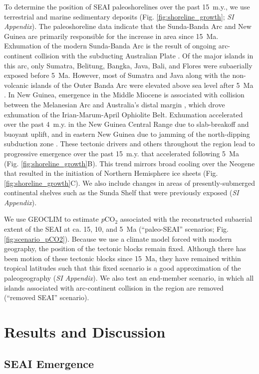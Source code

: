 \documentclass[9pt,twocolumn,twoside,lineno]{pnas-new}
\newcommand{\pCOtwo}{\textit{p}CO$_{2}$\xspace}
\newcommand{\SI}{\textit{SI Appendix}\xspace}
\begin{document}
To determine the position of SEAI paleoshorelines over the past 15~m.y., we use terrestrial and marine sedimentary deposits (Fig. \ref{fig:shoreline_growth}; \SI). The paleoshoreline data indicate that the Sunda-Banda Arc and New Guinea are primarily responsible for the increase in area since 15~Ma. Exhumation of the modern Sunda-Banda Arc is the result of ongoing arc-continent collision with the subducting Australian Plate \cite{Harris2006a}. Of the major islands in this arc, only Sumatra, Belitung, Bangka, Java, Bali, and Flores were subaerially exposed before 5~Ma. However, most of Sumatra and Java along with the non-volcanic islands of the Outer Banda Arc were elevated above sea level after 5~Ma \cite{Hall2013b}. In New Guinea, emergence in the Middle Miocene is associated with collision between the Melanesian Arc and Australia's distal margin \cite{Cloos2005a}, which drove exhumation of the Irian-Marum-April Ophiolite Belt. Exhumation accelerated over the past 4~m.y. in the New Guinea Central Range due to slab-breakoff and buoyant uplift, and in eastern New Guinea due to jamming of the north-dipping subduction zone \cite{Cloos2005a}. These tectonic drivers and others throughout the region lead to progressive emergence over the past 15~m.y. that accelerated following 5~Ma (Fig. \ref{fig:shoreline_growth}B). This trend mirrors broad cooling over the Neogene that resulted in the initiation of Northern Hemisphere ice sheets (Fig. \ref{fig:shoreline_growth}C). We also include changes in areas of presently-submerged continental shelves such as the Sunda Shelf that were previously exposed (\SI).

We use GEOCLIM to estimate \pCOtwo associated with the reconstructed subaerial extent of the SEAI at ca. 15, 10, and 5~Ma (``paleo-SEAI'' scenarios; Fig. \ref{fig:scenario_pCO2}). Because we use a climate model forced with modern geography, the position of the tectonic blocks remain fixed. Although there has been motion of these tectonic blocks since 15~Ma, they have remained within tropical latitudes such that this fixed scenario is a good approximation of the paleogeography (\SI). We also test an end-member scenario, in which all islands associated with arc-continent collision in the region are removed (``removed SEAI'' scenario).

\section*{Results and Discussion}

\subsection*{SEAI Emergence}
\end{document}
